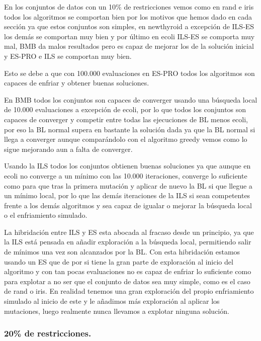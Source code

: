 \documentclass[12pt, spanish]{article}
\begin{document}
En los conjuntos de datos con un 10\% de restricciones vemos como en rand e iris todos los algoritmos se comportan bien por los motivos que hemos dado en cada sección ya que estos conjuntos son simples, en newthyroid a excepción de ILS-ES los demás se comportan muy bien y por último en ecoli ILS-ES se comporta muy mal,  BMB da malos resultados pero es capaz de mejorar los de la solución inicial y ES-PRO e ILS se comportan muy bien.


Esto se debe a que con 100.000 evaluaciones en ES-PRO todos los algoritmos son capaces de enfriar y obtener buenas soluciones. 

En BMB todos los conjuntos son capaces de converger usando una búsqueda local de 10.000 evaluaciones a excepción de ecoli, por lo que todos los conjuntos son capaces de converger y competir entre todas las ejecuciones de BL menos ecoli, por eso la BL normal supera en bastante la solución dada ya que la BL normal si llega a converger aunque comparándolo con el algoritmo greedy vemos como lo sigue mejorando aun a falta de converger.

Usando la ILS todos los conjuntos obtienen buenas soluciones ya que aunque en ecoli no converge a un mínimo con las 10.000 iteraciones, converge lo suficiente como para que tras la primera mutación y aplicar de nuevo la BL si que llegue a un mínimo local, por lo que las demás iteraciones de la ILS si sean competentes frente a los demás algoritmos y sea capaz de igualar o mejorar la búsqueda local o el enfriamiento simulado.

La hibridación entre ILS y ES esta abocada al fracaso desde un principio, ya que la ILS está pensada en añadir exploración a la búsqueda local, permitiendo salir de mínimos una vez son alcanzados por la BL. Con esta hibridación estamos usando un ES que de por si tiene la gran parte de exploración al inicio del algoritmo y con tan pocas evaluaciones no es capaz de enfriar lo suficiente como para explotar a no ser que el conjunto de datos sea muy simple, como es el caso de rand o iris. En realidad tenemos una gran exploración del propio enfriamiento simulado al inicio de este y le añadimos más exploración al aplicar los mutaciones, luego realmente nunca llevamos a explotar ninguna solución.

\subsubsection{20\% de restricciones.}
\end{document}
